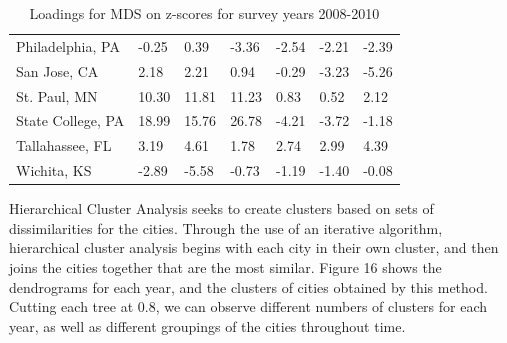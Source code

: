 \documentclass[11pt]{asaproc}
\begin{document}
\begin{table}[H]
\begin{center}
{\begin{tabular}{P{3.75cm}{r}{r}{r}{r}{r}{r}}
Philadelphia, PA & -0.25 & 0.39 & -3.36 & -2.54 & -2.21 & -2.39 \\
San Jose, CA & 2.18 & 2.21 & 0.94 & -0.29 & -3.23 & -5.26  \\
St. Paul, MN & 10.30 & 11.81 & 11.23 & 0.83 & 0.52 & 2.12  \\
State College, PA & 18.99 & 15.76 & 26.78 & -4.21 & -3.72 & -1.18 \\
Tallahassee, FL & 3.19 & 4.61 & 1.78 & 2.74 & 2.99 & 4.39  \\
Wichita, KS & -2.89 & -5.58 & -0.73 & -1.19 & -1.40 & -0.08 \\
\hline
\end{tabular}}
\caption{Loadings for MDS on z-scores for survey years 2008-2010}
\label{table:MDSzscores}
\end{center}
\end{table}

\pagebreak

Hierarchical Cluster Analysis seeks to create clusters based on sets of
dissimilarities for the cities. Through the use of an iterative
algorithm, hierarchical cluster analysis begins with each city in
their own cluster, and then joins the cities together that are the
most similar. Figure 16 shows the dendrograms for each year, and the
clusters of cities obtained by this method. Cutting each tree at 0.8,
we can observe different numbers of clusters for each year, as well as
different groupings of the cities throughout time.
\end{document}
